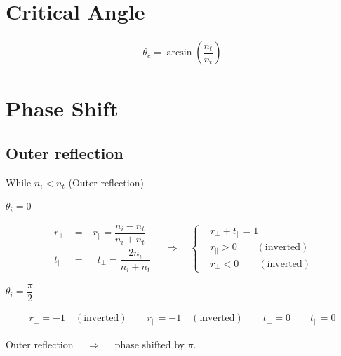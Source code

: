\section{Critical Angle}

\begin{equation*}
  \begin{aligned}
    \theta_c = \arcsin \left( \dfrac{n_t}{n_i}  \right)
  \end{aligned}
\end{equation*}

\section{Phase Shift}

\subsection{Outer reflection}

While $n_i < n_t$ (Outer reflection)

$\theta_i = 0$

\begin{equation*}
  \begin{aligned}
    r_{\perp} &= - r_{\parallel} = \dfrac{n_i - n_t}{n_i + n_t} \\
    t_{\parallel} &= \phantom{+} t_{\perp} = \dfrac{2 n_i}{n_i + n_t} 
  \end{aligned}
  \quad \Rightarrow \quad 
  \left\{
  \begin{aligned}
    & r_{\perp} + t_{\parallel} = 1 \\
    & r_{\parallel} > 0 \quad\quad \left( \text{inverted} \right) \\
    & r_{\perp} < 0 \quad\quad \left( \text{inverted} \right)
  \end{aligned}
  \right.
\end{equation*}

$\theta_i = \dfrac{\pi}{2} $

\begin{equation*}
  \begin{aligned}
    r_{\perp} = -1 \quad \left( \text{inverted} \right) \quad\quad r_{\parallel} = -1 \quad \left( \text{inverted} \right) \quad\quad t_{\perp} = 0 \quad\quad t_{\parallel} = 0
  \end{aligned}
\end{equation*}

Outer reflection $\quad \Rightarrow \quad $ phase shifted by $\pi$.

